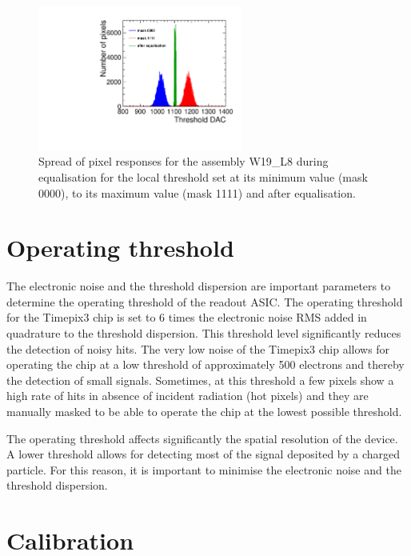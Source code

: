 \begin{figure}[htbp] 
  \centering
  \includegraphics[width=0.6\textwidth]{./figures/Calibration/THLequalisation_W19_L8.pdf}
  \caption{Spread of pixel responses for the assembly W19\_L8 during
    equalisation for the local threshold set at its minimum value
    (mask 0000), to its maximum value (mask 1111) and after
    equalisation.}
  \label{fig:THLequalisation}
\end{figure}


\section{Operating threshold} 
\label{sec:operatingThreshold}

The electronic noise and the threshold dispersion are important
parameters to determine the operating threshold of the readout
ASIC. The operating threshold for the Timepix3 chip is set to 6 times
the electronic noise RMS added in quadrature to the threshold
dispersion. This threshold level significantly reduces the detection
of noisy hits. The very low noise of the Timepix3 chip allows for
operating the chip at a low threshold of approximately 500 electrons
and thereby the detection of small signals. Sometimes, at this
threshold a few pixels show a high rate of hits in absence of incident
radiation (hot pixels) and they are manually masked to be able to
operate the chip at the lowest possible threshold.

The operating threshold affects significantly the spatial resolution
of the device. A lower threshold allows for detecting most of the
signal deposited by a charged particle. For this reason, it is
important to minimise the electronic noise and the threshold
dispersion.


\section{Calibration} 
\label{sec:calibration} 

